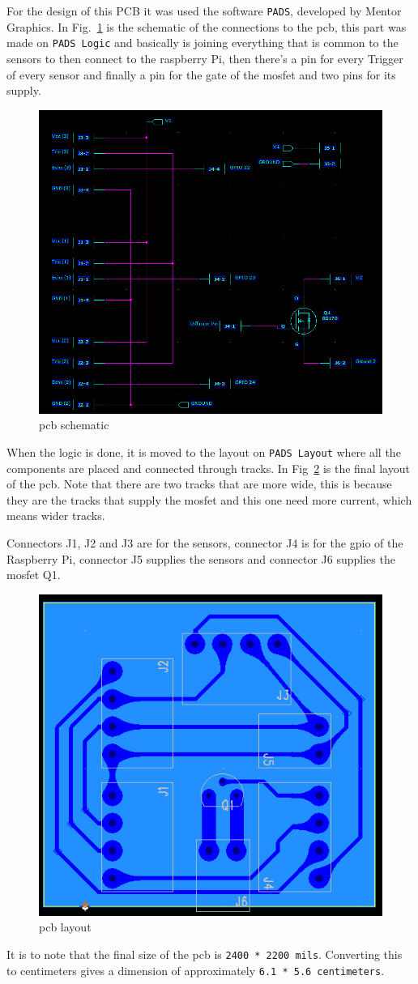 For the design of this PCB it was used the software \texttt{PADS}, developed by Mentor Graphics.
In Fig.~\ref{fig:pcb-schematic} is the schematic of the connections to the \gls{pcb}, this part was made on \texttt{PADS Logic} and basically is joining everything that is common to the sensors to then connect to the raspberry Pi, then there's a pin for every Trigger of every sensor and finally a pin for the gate of the \gls{mosfet} and two pins for its supply.
%
\begin{figure}[htb!]
\centering
    \includegraphics[width=0.7\columnwidth]{./img/pcb-logic.png}
  \caption{\gls{pcb} schematic}%
\label{fig:pcb-schematic}
\end{figure}

When the logic is done, it is moved to the layout on \texttt{PADS Layout} where all the components are placed and connected through tracks. In Fig~\ref{fig:pcb-layout} is the final layout of the \gls{pcb}. Note that there are two tracks that are more wide, this is because they are the tracks that supply the \gls{mosfet} and this one need more current, which means wider tracks.

Connectors J1, J2 and J3 are for the sensors, connector J4 is for the \gls{gpio} of the Raspberry Pi, connector J5 supplies the sensors and connector J6 supplies the \gls{mosfet} Q1.
%
\begin{figure}[htb!]
\centering
    \includegraphics[width=0.6\columnwidth]{./img/pcb-layout.png}
  \caption{\gls{pcb} layout}%
\label{fig:pcb-layout}
\end{figure}

It is to note that the final size of the \gls{pcb} is \texttt{2400 * 2200 mils}. Converting this to centimeters gives a dimension of approximately \texttt{6.1 * 5.6 centimeters}.
%  
